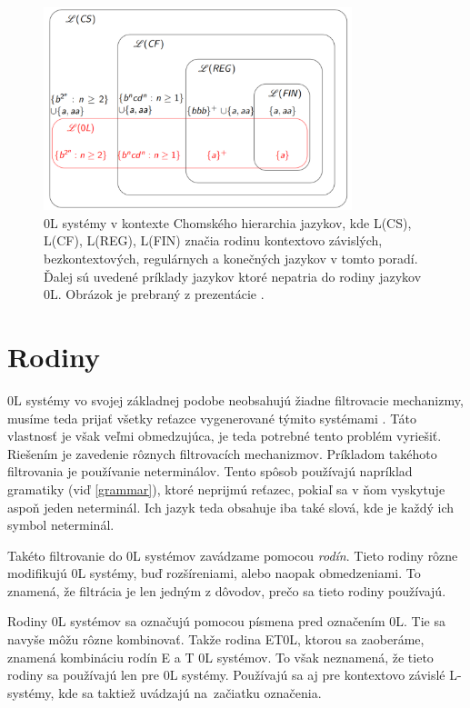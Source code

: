 \begin{figure}[hbt]
	\centering
	\includegraphics[width=0.8\textwidth]{obrazky-figures/0Lhierarchy.png}
	\caption{0L systémy v kontexte Chomského hierarchia jazykov, kde L(CS), L(CF), L(REG), L(FIN) značia rodinu kontextovo závislých, bezkontextových, regulárnych a konečných jazykov v tomto poradí. Ďalej sú uvedené príklady jazykov ktoré nepatria do rodiny jazykov 0L. Obrázok je prebraný z prezentácie \cite{TIDPresentation}.}
	\label{0LHierarchy}
\end{figure}

\section{Rodiny}
\label{0LFamilies}
0L systémy vo svojej základnej podobe neobsahujú žiadne filtrovacie mechanizmy, musíme teda prijať všetky reťazce vygenerované týmito systémami \cite{handbook}. Táto vlastnosť je však veľmi obmedzujúca, je teda potrebné tento problém vyriešiť. Riešením je zavedenie rôznych filtrovacích mechanizmov. Príkladom takéhoto filtrovania je používanie neterminálov. Tento spôsob používajú napríklad gramatiky (viď \ref{grammar}), ktoré neprijmú reťazec, pokiaľ sa v ňom vyskytuje aspoň jeden neterminál. Ich jazyk teda obsahuje iba také slová, kde je každý ich symbol neterminál.

Takéto filtrovanie do 0L systémov zavádzame pomocou \textit{rodín}. Tieto rodiny rôzne modifikujú 0L systémy, buď rozšíreniami, alebo naopak obmedzeniami. To znamená, že filtrácia je len jedným z dôvodov, prečo sa tieto rodiny používajú.

Rodiny 0L systémov sa označujú pomocou písmena pred označením 0L. Tie sa navyše môžu rôzne kombinovať. Takže rodina ET0L, ktorou sa zaoberáme, znamená kombináciu rodín E a T 0L systémov. To však neznamená, že tieto rodiny sa používajú len pre 0L systémy. Používajú sa aj pre kontextovo závislé L-systémy, kde sa taktiež uvádzajú na~začiatku označenia.

